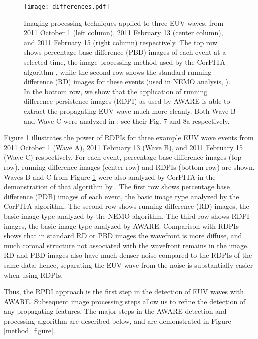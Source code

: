 \begin{figure}
\begin{center}
\texttt{[image: differences.pdf]}
\caption{Imaging processing techniques applied to three EUV waves,
  from 2011 October 1 (left column), 2011 February 13 (center column),
  and 2011 February 15 (right column) respectively. The top row shows
  percentage base difference (PBD) images of each event at a selected
  time, the image processing method used by the CorPITA algorithm
  \citep{2014SoPh..289.3279L}, while the second row shows the standard
  running difference (RD) images for these events (used in NEMO
  analysis, \citep{2005SoPh..228..265P}). In the bottom row, we show
  that the application of running difference persistence images (RDPI)
  as used by AWARE is able to extract the propagating EUV wave much
  more cleanly. Both Wave B and Wave C were analyzed in
  \cite{2014SoPh..289.3279L}; see their Fig. 7 and 8a respectively.}
\label{rpdm_figure}
\end{center}
\end{figure}

Figure \ref{rpdm_figure} illustrates the power of RDPIs for three
example EUV wave events from 2011 October 1 (Wave A), 2011 February 13
(Wave B), and 2011 February 15 (Wave C) respectively. For each event,
percentage base difference images (top row), running difference images
(center row) and RDPIs (bottom row) are shown. Waves B and C from
Figure \ref{rpdm_figure} were also analyzed by CorPITA in the
demonstration of that algorithm by \citet{2014SoPh..289.3279L}.  The
first row shows percentage base difference (PDB) images of each event,
the basic image type analyzed by the CorPITA algorithm.  The second
row shows running difference (RD) images, the basic image type
analyzed by the NEMO algorithm.  The third row shows RDPI images, the
basic image type analyzed by AWARE. Comparison with RDPIs shows that
in standard RD or PBD images the wavefront is more diffuse, and much
coronal structure not associated with the wavefront remains in the
image. RD and PBD images also have much denser noise compared to the
RDPIs of the same data; hence, separating the EUV wave from the noise
is substantially easier when using RDPIs.

Thus, the RPDI approach is the first step in the detection of EUV
waves with AWARE. Subsequent image processing steps allow us to refine
the detection of any propagating features. The major steps in the
AWARE detection and processing algorithm are described below, and are
demonstrated in Figure \ref{method_figure}.

